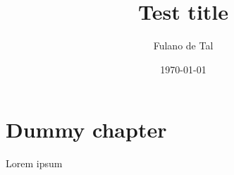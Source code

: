 \documentclass{tesisusach}
\title{Test title}
\author{Fulano de Tal}
\date{\today}
\begin{document}
\maketitle

\frontmatter
\chapter{Dummy chapter}

Lorem ipsum
\end{document}
